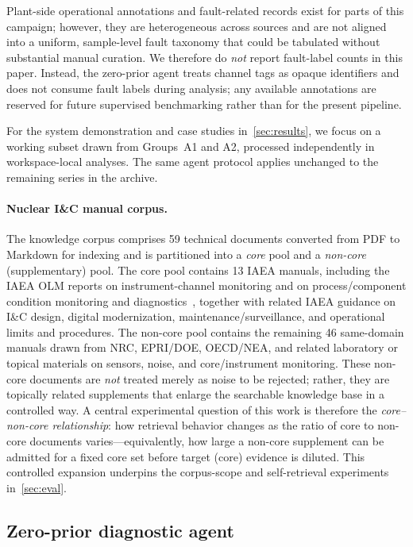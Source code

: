 Plant-side operational annotations and fault-related records exist for parts of this campaign; however,
they are heterogeneous across sources and are not aligned into a uniform, sample-level fault taxonomy
that could be tabulated without substantial manual curation.
We therefore do \emph{not} report fault-label counts in this paper.
Instead, the zero-prior agent treats channel tags as opaque identifiers and does not consume fault labels
during analysis; any available annotations are reserved for future supervised benchmarking rather than
for the present pipeline.

For the system demonstration and case studies in~\cref{sec:results}, we focus on a working subset drawn
from Groups~A1 and A2, processed independently in workspace-local analyses.
The same agent protocol applies unchanged to the remaining series in the archive.

\paragraph{Nuclear I\&C manual corpus.}
The knowledge corpus comprises 59 technical documents converted from PDF to Markdown for indexing
and is partitioned into a \emph{core} pool and a \emph{non-core} (supplementary) pool.
The core pool contains 13 IAEA manuals, including the IAEA OLM reports on instrument-channel
monitoring and on process/component condition monitoring and
diagnostics~\citep{iaea2008olm1,iaea2008olm2}, together with related IAEA guidance on I\&C design,
digital modernization, maintenance/surveillance, and operational limits and procedures.
The non-core pool contains the remaining 46 same-domain manuals drawn from NRC, EPRI/DOE,
OECD/NEA, and related laboratory or topical materials on sensors, noise, and core/instrument
monitoring.
These non-core documents are \emph{not} treated merely as noise to be rejected; rather, they are
topically related supplements that enlarge the searchable knowledge base in a controlled way.
A central experimental question of this work is therefore the \emph{core--non-core relationship}:
how retrieval behavior changes as the ratio of core to non-core documents varies---equivalently,
how large a non-core supplement can be admitted for a fixed core set before target (core) evidence
is diluted.
This controlled expansion underpins the corpus-scope and self-retrieval experiments
in~\cref{sec:eval}.
\subsection{Zero-prior diagnostic agent}
\label{sec:agent}
